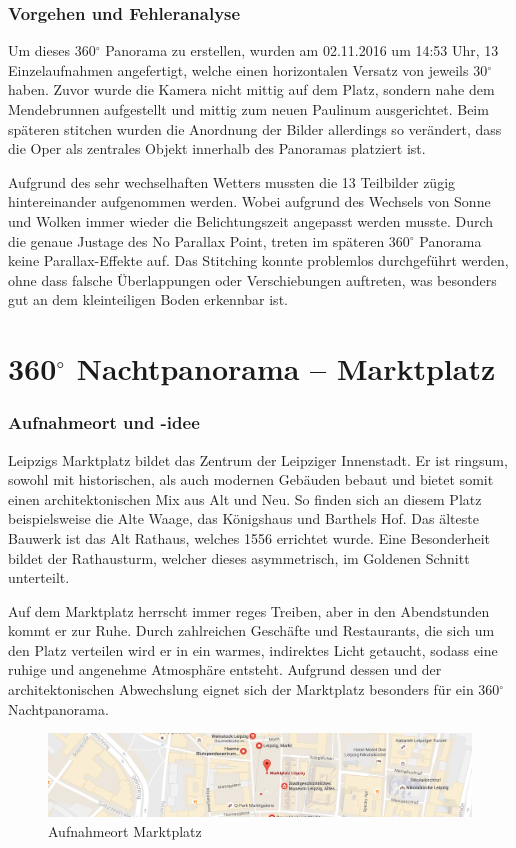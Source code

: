 \documentclass[liststotoc,bibtotoc,fontsize=14pt,]{scrreprt}
\begin{document}
	\subsubsection{Vorgehen und Fehleranalyse}
	Um dieses 360$^\circ$ Panorama zu erstellen, wurden am 02.11.2016 um 14:53 Uhr, 13 Einzelaufnahmen angefertigt, welche einen horizontalen Versatz von jeweils 30$^\circ$ haben. Zuvor wurde die Kamera nicht mittig auf dem Platz, sondern nahe dem Mendebrunnen aufgestellt und mittig zum neuen Paulinum ausgerichtet. Beim späteren stitchen wurden die Anordnung der Bilder allerdings so verändert, dass die Oper als zentrales Objekt innerhalb des Panoramas platziert ist. 
	
	\bigskip
		Aufgrund des sehr wechselhaften Wetters mussten die 13 Teilbilder zügig hintereinander aufgenommen werden. Wobei aufgrund des Wechsels von Sonne und Wolken immer wieder die Belichtungszeit angepasst werden musste. Durch die genaue Justage des No Parallax Point, treten im späteren 360$^\circ$ Panorama keine Parallax-Effekte auf. Das Stitching konnte problemlos durchgeführt werden, ohne dass falsche Überlappungen oder Verschiebungen auftreten, was besonders gut an dem kleinteiligen Boden erkennbar ist.

	
	\section{360$^\circ$ Nachtpanorama -- Marktplatz}
	\label{sec:markt}
		\subsubsection{Aufnahmeort und -idee}
		Leipzigs Marktplatz bildet das Zentrum der Leipziger Innenstadt. Er ist ringsum, sowohl mit historischen, als auch modernen Gebäuden bebaut und bietet somit einen architektonischen Mix aus Alt und Neu. So finden sich an diesem Platz beispielsweise die Alte Waage, das Königshaus und Barthels Hof. Das älteste Bauwerk ist das Alt Rathaus, welches 1556 errichtet wurde. Eine Besonderheit bildet der Rathausturm, welcher dieses asymmetrisch, im Goldenen Schnitt unterteilt. 
		
		\bigskip
		Auf dem Marktplatz herrscht immer reges Treiben, aber in den Abendstunden kommt er zur Ruhe. Durch zahlreichen Geschäfte und Restaurants, die sich um den Platz verteilen wird er in ein warmes, indirektes Licht getaucht, sodass eine ruhige und angenehme Atmosphäre entsteht. Aufgrund dessen und der architektonischen Abwechslung eignet sich der Marktplatz besonders für ein 360$^\circ$ Nachtpanorama.
		\begin{figure}[H]
			\includegraphics[width=\linewidth]{img/places/mp_map.jpg}
			\caption{Aufnahmeort Marktplatz}
			\label{img:mp_map}
		\end{figure}
		
\end{document}
